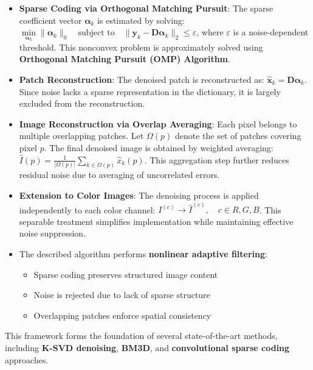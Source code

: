 \documentclass[11pt]{article}
\providecommand{\tightlist}{%
      \setlength{\itemsep}{0pt}\setlength{\parskip}{0pt}}
\begin{document}
\begin{itemize}
  making the dictionary overcomplete, where \(\mathbf{D}\) is a
  \textbf{redundant DCT dictionary}, well suited for representing local
  image structures such as edges and textures.
\item
  \textbf{Sparse Coding via Orthogonal Matching Pursuit}: The sparse
  coefficient vector \(\boldsymbol{\alpha}_k\) is estimated by solving:
  \(\underset{\boldsymbol{\alpha}_k}{\min} \|\boldsymbol{\alpha}_k\|_0 \quad \text{subject to} \quad \|\mathbf{y}_k - \mathbf{D}\boldsymbol{\alpha}_k\|_2 \le \varepsilon\),
  where \(\varepsilon\) is a noise-dependent threshold. This nonconvex
  problem is approximately solved using \textbf{Orthogonal Matching
  Pursuit (OMP) Algorithm}.
\item
  \textbf{Patch Reconstruction}: The denoised patch is reconstructed as:
  \(\hat{\mathbf{x}}_k = \mathbf{D}\boldsymbol{\alpha}_k\). Since noise
  lacks a sparse representation in the dictionary, it is largely
  excluded from the reconstruction.
\item
  \textbf{Image Reconstruction via Overlap Averaging}: Each pixel
  belongs to multiple overlapping patches. Let \(\Omega(p)\) denote the
  set of patches covering pixel \(p\). The final denoised image is
  obtained by weighted averaging:
  \(\hat{I}(p) = \frac{1}{|\Omega(p)|} \sum\limits_{k \in \Omega(p)} \hat{x}_k(p)\).
  This aggregation step further reduces residual noise due to averaging
  of uncorrelated errors.
\item
  \textbf{Extension to Color Images}: The denoising process is applied
  independently to each color channel:
  \(I^{(c)} \rightarrow \hat{I}^{(c)}, \quad c \in {R, G, B}\). This
  separable treatment simplifies implementation while maintaining
  effective noise suppression.
\item
  The described algorithm performs \textbf{nonlinear adaptive
  filtering}:

  \begin{itemize}
  \tightlist
  \item
    Sparse coding preserves structured image content
  \item
    Noise is rejected due to lack of sparse structure
  \item
    Overlapping patches enforce spatial consistency
  \end{itemize}
\end{itemize}

This framework forms the foundation of several state-of-the-art methods,
including \textbf{K-SVD denoising}, \textbf{BM3D}, and
\textbf{convolutional sparse coding} approaches.
\end{document}
